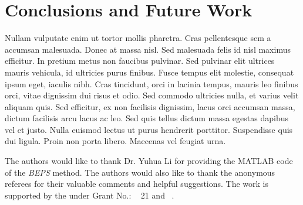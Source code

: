 \documentclass[sigconf]{acmart}
\begin{document}
\section{Conclusions and Future Work}

Nullam vulputate enim ut tortor mollis pharetra. Cras pellentesque sem a accumsan malesuada. Donec at massa nisl. Sed malesuada felis id nisl maximus efficitur. In pretium metus non faucibus pulvinar. Sed pulvinar elit ultrices mauris vehicula, id ultricies purus finibus. Fusce tempus elit molestie, consequat ipsum eget, iaculis nibh. Cras tincidunt, orci in lacinia tempus, mauris leo finibus orci, vitae dignissim dui risus et odio. Sed commodo ultricies nulla, et varius velit aliquam quis. Sed efficitur, ex non facilisis dignissim, lacus orci accumsan massa, dictum facilisis arcu lacus ac leo. Sed quis tellus dictum massa egestas dapibus vel et justo. Nulla euismod lectus ut purus hendrerit porttitor. Suspendisse quis dui ligula. Proin non porta libero. Maecenas vel feugiat urna.

\begin{acks}
The authors would like to thank Dr. Yuhua Li for providing the MATLAB code of the \textit{BEPS} method.
The authors would also like to thank the anonymous referees for their valuable comments and helpful suggestions. The work is supported by the  under Grant No.: ~
21 and ~.
\end{acks}



\end{document}
